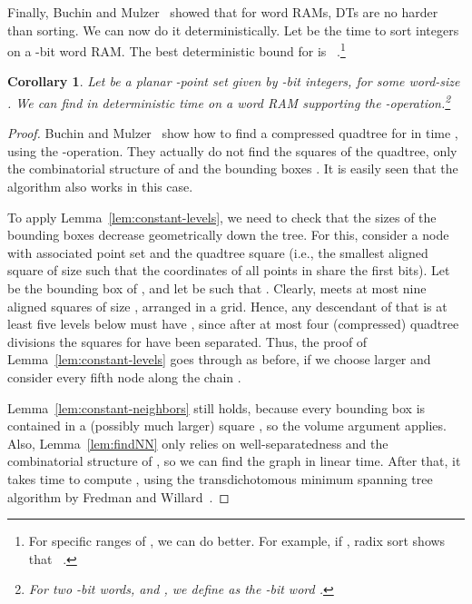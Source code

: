 \documentclass[11pt]{paper}
\newtheorem {cor}[theorem] {Corollary}
\begin{document}
  Finally, Buchin and Mulzer~\cite{BuchinMu11} 
  showed that for word RAMs, DTs are no harder than sorting. 
  We can now do it deterministically.
  Let  be the time to sort  integers
  on a -bit word RAM. The best deterministic bound
  for  is 
  ~\cite{Han04}.\footnote{For specific ranges of , 
  we can do better.
  For example, if ,  radix sort shows
  that ~\cite{CormenLeRiSt09}.}
  \begin {cor}\label{cor:wramDT}
     Let  be a planar -point set given by -bit integers, for some 
     word-size . 
     We can find  in deterministic time  on
     a word RAM supporting the 
     -operation.\footnote{For two -bit words,
      and , we define
      as the -bit word
     .}
  \end {cor}

\begin{proof}
      Buchin and Mulzer~\cite{BuchinMu11} show how to find a
      compressed quadtree   for  in time ,
      using the -operation. They actually do not
      find the squares of the quadtree, only the combinatorial
      structure of  and the bounding boxes .  It is
      easily seen that the algorithm  also works
      in this case.

      To apply Lemma~\ref{lem:constant-levels}, we need to check that
      the sizes of the bounding boxes decrease geometrically down the
      tree. For this, consider a node  with associated point
      set  and the quadtree square  (i.e., the smallest aligned
      square of size  such that the coordinates of all points
      in  share the first  bits). Let  be the bounding box
      of , and let  be such that .
      Clearly,  meets at most nine aligned squares of size ,
      arranged in a  grid. Hence, any descendant  of
       that is at least five levels below  must have
      , since after at most
      four (compressed) quadtree divisions the  squares for  have
      been separated. Thus, the proof of Lemma~\ref{lem:constant-levels}
      goes through as before, if we choose  larger and
      consider every fifth node along the chain .

      Lemma~\ref{lem:constant-neighbors} still holds, because
      every bounding box  is contained in a (possibly much
      larger) square , so the volume argument applies.
      Also, Lemma~\ref{lem:findNN} only relies on well-separatedness
      and the combinatorial structure of , so we can find
      the graph  in linear time. After that, it takes 
      time to compute , using the transdichotomous minimum
      spanning tree algorithm by Fredman and Willard~\cite{FredmanWi94}.
\end{proof}
\end{document}
